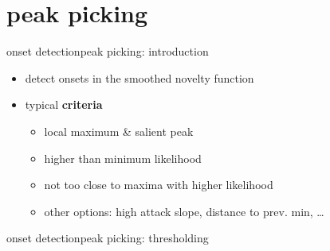     \section{peak picking}
        \begin{frame}{onset detection}{peak picking: introduction}
            \vspace{-4mm}
            \begin{itemize}
                \item	detect onsets in the smoothed novelty function
                    \vspace{-1mm}
                \vspace{-3mm}
                \item<2->	typical \textbf{criteria}
                    \begin{itemize}
                        \item<2->	local maximum \& salient peak
                        \item<2->	higher than minimum likelihood
                        \item<2->	not too close to maxima with higher likelihood
                        \item<2->	other options: high attack slope, distance to prev. min, \ldots
                    \end{itemize}
            \end{itemize}
        \end{frame}
        \begin{frame}{onset detection}{peak picking: thresholding}
        \end{frame}
